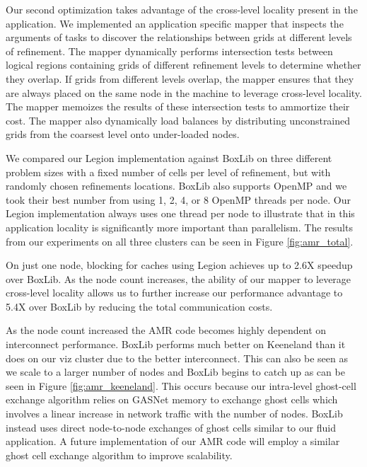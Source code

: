 Our second optimization takes advantage of the cross-level locality present in the application.  We implemented
an application specific mapper that inspects the arguments of tasks to discover the relationships between
grids at different levels of refinement.  The mapper dynamically performs intersection tests between logical regions
containing grids of different refinement levels to determine whether they overlap.  
If grids from different levels overlap, the mapper
ensures that they are always placed on the same node in the machine to leverage cross-level locality.  The mapper
memoizes the results of these intersection tests to ammortize their cost.  The mapper also dynamically
load balances by distributing unconstrained grids from the coarsest level onto under-loaded nodes.

We compared our Legion implementation against BoxLib on three different problem sizes with a fixed number
of cells per level of refinement, but with randomly chosen refinements locations.  BoxLib also supports OpenMP
and we took their best number from using 1, 2, 4, or 8 OpenMP threads per node.  Our Legion implementation
always uses one thread per node to illustrate that in this application locality is significantly more important 
than parallelism.  The results from our experiments on all three clusters can be seen in Figure \ref{fig:amr_total}. 

On just one node, blocking for caches using Legion achieves up to 2.6X speedup over BoxLib.  As the node count 
increases, the ability of our mapper to leverage cross-level locality allows us to further increase
our performance advantage to 5.4X over BoxLib by reducing the total communication costs.  

As the node count increased the AMR code becomes highly dependent on interconnect performance.  BoxLib performs much better
on Keeneland than it does on our viz cluster due to the better interconnect.  This can also be seen as we scale
to a larger number of nodes and BoxLib begins to catch up as can be seen in Figure \ref{fig:amr_keeneland}.  
This occurs because our intra-level ghost-cell exchange algorithm relies on GASNet memory to exchange ghost cells which 
involves a linear increase in network traffic with the number of nodes.  BoxLib instead uses direct
node-to-node exchanges of ghost cells similar to our fluid application.  A future implementation of our AMR code 
will employ a similar ghost cell exchange algorithm to improve scalability.

